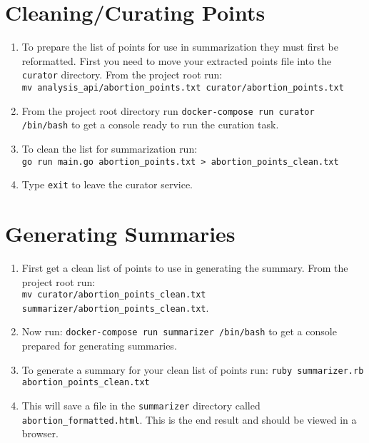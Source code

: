 \section{Cleaning/Curating Points}
\begin{enumerate}
	\item{To prepare the list of points for use in summarization they must first be reformatted. First you need to move your extracted points file into the \texttt{curator} directory. From the project root run: \\ \texttt{mv analysis\_api/abortion\_points.txt curator/abortion\_points.txt}}
	\item{From the project root directory run \texttt{docker-compose run curator /bin/bash} to get a console ready to run the curation task.}
	\item{To clean the list for summarization run: \\ \texttt{go run main.go abortion\_points.txt > abortion\_points\_clean.txt}}
    \item{Type \texttt{exit} to leave the curator service.}
\end{enumerate}

\section{Generating Summaries}
\begin{enumerate}
	\item{First get a clean list of points to use in generating the summary. From the project root run: \\ \texttt{mv curator/abortion\_points\_clean.txt summarizer/abortion\_points\_clean.txt}.}
	\item{Now run: \texttt{docker-compose run summarizer /bin/bash} to get a console prepared for generating summaries.}
	\item{To generate a summary for your clean list of points run: \texttt{ruby summarizer.rb abortion\_points\_clean.txt}}
	\item{This will save a file in the \texttt{summarizer} directory called \texttt{abortion\_formatted.html}. This is the end result and should be viewed in a browser.}
\end{enumerate}

